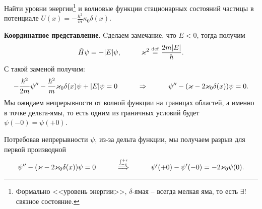 
\begin{leftrules}
Найти уровни энергии\footnote{
    Формально <<уровень энергии>>, $\delta$-ямая -- всегда мелкая яма, то есть $\exists !$ связное состояние.
} и волновые функции стационарных состояний частицы в потенциале $U(x) = - \frac{\hbar^2}{m}\kappa_0 \delta(x)$.
\end{leftrules}


\textbf{Координатное представление}. 
Cделаем замечание, что $E < 0$, тогда получим
\begin{equation*}
    \hat{H} \psi = - |E| \psi,
    \hspace{1 cm}
    \kappa^2 \overset{\mathrm{def}}{=}  \frac{2 m |E|}{\hbar}.
\end{equation*}
С такой заменой получим:
\begin{equation*}
    -\frac{\hbar^2}{2m} \psi'' - \frac{\hbar^2}{m}\kappa_0 \delta(x) \psi + |E|\psi = 0
    \hspace{1 cm}
    \Rightarrow
    \hspace{1 cm}
    \psi'' - (\kappa - 2 \kappa_0 \delta(x))\psi=0.
\end{equation*}
Мы ожидаем непрерывности от волной функции на границах областей, а именно в точке дельта-ямы, то есть одним из граничных условий будет $\psi(-0) = \psi(+0)$.

Потребовав непрерывности $\psi$, из-за дельта функции,  мы получаем разрыв для первой производной
\begin{equation*}
    \psi'' - (\kappa - 2 \kappa_0 \delta(x))\psi=0
    \hspace{1 cm}
    \overset{\int_{-\varepsilon}^{+\varepsilon} }{\Longrightarrow}
    \hspace{1 cm}
    \psi'(+0) - \psi'(-0) = - 2 \kappa_0 \psi(0).
\end{equation*}

